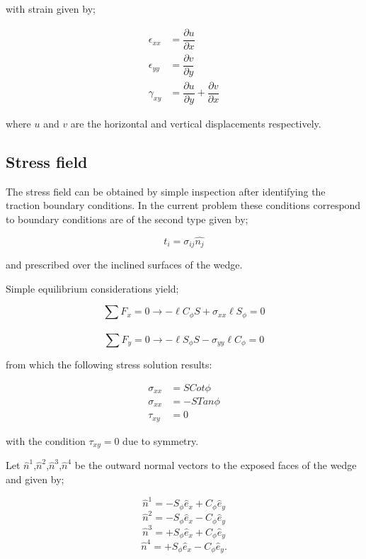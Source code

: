 with strain given by;

\begin{equation}
\begin{aligned}
\epsilon_{xx}&=\dfrac{\partial u}{\partial x}\\
\epsilon_{yy}&=\dfrac{\partial v}{\partial y}\\
\gamma_{xy}&=\dfrac{\partial u}{\partial y}+\dfrac{\partial v}{\partial x}
\end{aligned}
\label{strain}
\end{equation}

where $u$ and $v$ are the horizontal and vertical displacements respectively.

\subsection*{Stress field}

The stress field can be obtained by simple inspection after identifying the traction boundary conditions. In the current problem these conditions correspond to boundary conditions are of the second type given by;

\begin{equation}
t_i=\sigma_{ij}\hat{n_j}
\label{bcs}
\end{equation}

and prescribed over the inclined surfaces of the wedge.

Simple equilibrium considerations yield;

\[\sum F_x=0 \longrightarrow -\ell C_\phi S+\sigma_{xx}\ell S_\phi=0\]\\
\[\sum F_y=0 \longrightarrow -\ell S_\phi S-\sigma_{yy}\ell C_\phi=0\] 

from which the following stress solution results:

\begin{equation}
\begin{aligned}
\sigma_{xx}&=SCot\phi\\
\sigma_{xx}&=-STan\phi\\
\tau_{xy}&=0
\end{aligned}
\label{solution}
\end{equation}

with the condition $\tau_{xy}=0$ due to symmetry.

Let $\hat{n}^1$,$\hat{n}^2$,$\hat{n}^3$,$\hat{n}^4$ be the outward normal vectors to the exposed faces of the wedge and given by;

\[\hat{n}^1=-S_{\phi}\hat{e}_{x}+C_{\phi}\hat{e}_{y}\]
\[\hat{n}^2=-S_{\phi}\hat{e}_{x}-C_{\phi}\hat{e}_{y}\]
\[\hat{n}^3=+S_{\phi}\hat{e}_{x}+C_{\phi}\hat{e}_{y}\]
\[\hat{n}^4=+S_{\phi}\hat{e}_{x}-C_{\phi}\hat{e}_{y}.\]

